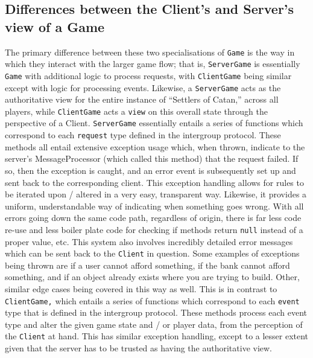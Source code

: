 \documentclass[a4paper,doc]{apa6}
\newcommand{\code}{\texttt}
\begin{document}
\subsection{Differences between the Client's and Server's view of a Game}
The primary difference between these two specialisations of \code{Game} is the way in which they interact with the larger game flow; that is, \code{ServerGame} is essentially \code{Game} with additional logic to process requests, with \code{ClientGame} being similar except with logic for processing events. Likewise, a \code{ServerGame} acts as the authoritative view for the entire instance of “Settlers of Catan,” across all players, while \code{ClientGame} acts a \code{view} on this overall state through the perspective of a Client. \code{ServerGame} essentially entails a series of functions which correspond to each \code{request} type defined in the intergroup protocol. These methods all entail extensive exception usage which, when thrown, indicate to the server’s MessageProcessor (which called this method) that the request failed. If so, then the exception is caught, and an error event is subsequently set up and sent back to the corresponding client. This exception handling allows for rules to be iterated upon / altered in a very easy, transparent way. Likewise, it provides a uniform, understandable way of indicating when something goes wrong. With all errors going down the same code path, regardless of origin, there is far less code re-use and less boiler plate code for checking if methods return \code{null} instead of a proper value, etc. This system also involves incredibly detailed error messages which can be sent back to the \code{Client}  in question. Some examples of exceptions being thrown are if a user cannot afford something, if the bank cannot afford something, and if an object already exists where you are trying to build. Other, similar edge cases being covered in this way as well. This is in contrast to \code{ClientGame,} which entails a series of functions which correspond to each \code{event} type that is defined in the intergroup protocol. These methods process each event type and alter the given game state and / or player data, from the perception of the \code{Client} at hand. This has similar exception handling, except to a lesser extent given that the server has to be trusted as having the authoritative view.
\end{document}
